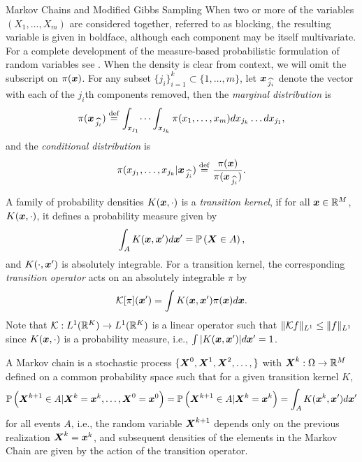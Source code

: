 \begin{chapter}{Markov Chains and Modified Gibbs Sampling}
When two or more of the variables $(X_1,\dots,X_m)$ are considered together, referred to as blocking, the resulting variable is given in boldface, although each component may be itself multivariate.
For a complete development of the measure-based probabilistic formulation of random variables see \citep{durrett2010probability,billingsley2008probability}.
When the density is clear from context, we will omit the subscript on $\pi(\mbox{\boldmath$x$})$.
For any subset $\{j_i\}_{i=1}^k \subset \{1,\dots,m\}$, let $\mbox{\boldmath$x$}_{\,\widehat{j_i}}$ denote the vector with each of the $j_i$th components removed, then the \emph{marginal distribution} is
\begin{equation}
  \pi(\mbox{\boldmath$x$}_{\,\widehat{j_i}}) \stackrel{\rm def}{=} \int_{x_{j_1}}\dots\int_{x_{j_k}} \pi(x_1,\dots,x_m)dx_{j_k}\dots dx_{j_1},
\end{equation}
and the \emph{conditional distribution} is
\begin{equation} \label{eq:conditionalDefn}
  \pi(x_{j_1},\dots,x_{j_k}|\mbox{\boldmath$x$}_{\,\widehat{j_i}}) \stackrel{\rm def}{=} \frac{\pi(\mbox{\boldmath$x$})}{\pi(\mbox{\boldmath$x$}_{\,\widehat{j_i}})}.
\end{equation}
  
A family of probability densities $K(\mbox{\boldmath$x$},\cdot)$ is a \emph{transition kernel}, if for all $\mbox{\boldmath$x$} \in \mathbb R^M$, $K(\mbox{\boldmath$x$},\cdot)$, it defines a probability measure given by 
\begin{equation}
  \int_A K(\mbox{\boldmath$x$},\mbox{\boldmath$x$}') d\mbox{\boldmath$x$}' = \mathbb P\left( \mbox{\boldmath$X$} \in A \right),
\end{equation}
and $K(\cdot , \mbox{\boldmath$x$}')$ is absolutely integrable.
For a transition kernel, the corresponding \emph{transition operator} acts on an absolutely integrable $\pi$ by
\begin{equation}
  \mathcal K [\pi](\mbox{\boldmath$x$}') = \int K(\mbox{\boldmath$x$},\mbox{\boldmath$x$}') \pi(\mbox{\boldmath$x$})d\mbox{\boldmath$x$}. \label{eq:transitionKernel}
\end{equation}
Note that $\mathcal K:L^1(\mathbb R^K) \to L^1(\mathbb R^K)$ is a linear operator such that $\|\mathcal K f\|_{L^1} \le \|f\|_{L^1}$ since $K(\mbox{\boldmath$x$},\cdot)$ is a probability measure, i.e., $\int |K(\mbox{\boldmath$x$},\mbox{\boldmath$x$}')|d\mbox{\boldmath$x$}' = 1$.

A Markov chain is a stochastic process $\{\mbox{\boldmath$X$}^0, \mbox{\boldmath$X$}^1,\mbox{\boldmath$X$}^2,\dots,\}$ with $\mbox{\boldmath$X$}^k:\Omega \to \mathbb R^M$ defined on a common probability space such that for a given transition kernel $K$,
\begin{equation}
  \mathbb P\left( \mbox{\boldmath$X$}^{k+1} \in A | \mbox{\boldmath$X$}^k= \mbox{\boldmath$x$}^k,\dots,\mbox{\boldmath$X$}^0=\mbox{\boldmath$x$}^0\right) 
    = \mathbb P\left( \mbox{\boldmath$X$}^{k+1} \in A | \mbox{\boldmath$X$}^k= \mbox{\boldmath$x$}^k\right) 
    = \int_A K(\mbox{\boldmath$x$}^k,\mbox{\boldmath$x$}') d\mbox{\boldmath$x$}'
\end{equation}
for all events $A$, i.e., the random variable $\mbox{\boldmath$X$}^{k+1}$ depends only on the previous realization $\mbox{\boldmath$X$}^k=\mbox{\boldmath$x$}^k$, and subsequent densities of the elements in the Markov Chain are given by the action of the transition operator.


\end{chapter}
